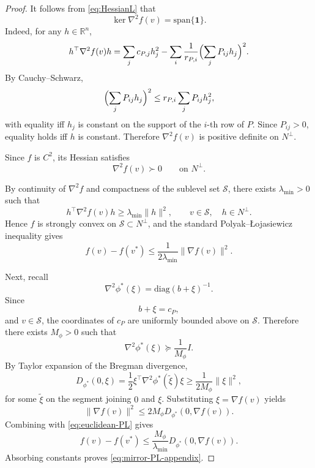 \documentclass{article}
\theoremstyle{plain}
\theoremstyle{remark}
\begin{document}
\begin{proof}
It follows from \eqref{eq:HessianL} that
\[
\ker \nabla^2 f(v)=\mathrm{span}\{\mathbf 1\}.
\]
Indeed, for any $h\in\mathbb R^n$,
\[
h^\top \nabla^2 f(v)h
=
\sum_j c_{P,j}h_j^2
-
\sum_i \frac1{r_{P,i}}
\Bigl(\sum_j P_{ij}h_j\Bigr)^2.
\]
By Cauchy--Schwarz,
\[
\Bigl(\sum_j P_{ij}h_j\Bigr)^2
\le
r_{P,i}\sum_j P_{ij}h_j^2,
\]
with equality iff $h_j$ is constant on the support of the $i$-th row of $P$.
Since $P_{ij}>0$, equality holds iff $h$ is constant.
Therefore $\nabla^2 f(v)$ is positive definite on $N^\perp$.

Since $f$ is $C^2$, its Hessian satisfies
\[
\nabla^2 f(v)\succ 0
\qquad\text{on }N^\perp.
\]

By continuity of $\nabla^2 f$ and compactness of the sublevel set $\mathcal S$, there exists $\lambda_{\min}>0$ such that
\[
h^\top \nabla^2 f(v) h
\ge
\lambda_{\min}\|h\|^2,
\qquad
v\in\mathcal S,
\quad
h\in N^\perp.
\]
Hence $f$ is strongly convex on $\mathcal S\subset N^\perp$, and the standard Polyak--\L ojasiewicz inequality gives
\begin{equation}
\label{eq:euclidean-PL}
f(v)-f(v^*)
\le
\frac{1}{2\lambda_{\min}}
\|\nabla f(v)\|^2.
\end{equation}

Next, recall
\[
\nabla^2\phi^*(\xi)
=
\mathrm{diag}(b+\xi)^{-1}.
\]
Since
\[
b+\xi=c_P,
\]
and $v\in\mathcal S$, the coordinates of $c_P$ are uniformly bounded above on $\mathcal S$.
Therefore there exists $M_\phi>0$ such that
\[
\nabla^2\phi^*(\xi)
\succeq
\frac1{M_\phi}I.
\]
By Taylor expansion of the Bregman divergence,
\[
D_{\phi^*}(0,\xi)
=
\frac12
\xi^\top
\nabla^2\phi^*(\tilde\xi)\xi
\ge
\frac1{2M_\phi}\|\xi\|^2,
\]
for some $\tilde\xi$ on the segment joining $0$ and $\xi$.
Substituting $\xi=\nabla f(v)$ yields
\[
\|\nabla f(v)\|^2
\le
2M_\phi D_{\phi^*}(0,\nabla f(v)).
\]
Combining with \eqref{eq:euclidean-PL} gives
\[
f(v)-f(v^*)
\le
\frac{M_\phi}{\lambda_{\min}}
D_{\phi^*}(0,\nabla f(v)).
\]
Absorbing constants proves \eqref{eq:mirror-PL-appendix}.
\end{proof}
\end{document}

